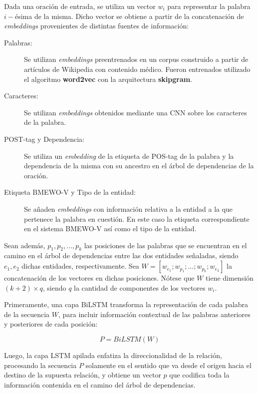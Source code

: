 Dada una oración de entrada, se utiliza un vector $w_i$ para representar la palabra $i-$ésima de la misma. Dicho vector se obtiene a partir de la concatenación de \textit{embeddings} provenientes de distintas fuentes de información:

\begin{description}
	\item[Palabras:] Se utilizan \textit{embeddings} preentrenados en un corpus construido a partir de artículos de Wikipedia con contenido médico.
	Fueron entrenados utilizado el algoritmo \textbf{word2vec}\cite{word2vec} con la arquitectura \textbf{skipgram}.
	
	\item[Caracteres:] Se utilizan \textit{embeddings} obtenidos mediante una CNN sobre los caracteres de la palabra.
	
	\item[POST-tag y Dependencia:] Se utiliza un \textit{embedding} de la etiqueta de POS-tag de la palabra y la dependencia de la misma con su ancestro en el árbol de dependencias de la oración.
	
	\item[Etiqueta BMEWO-V y Tipo de la entidad:] Se añaden \textit{embeddings} con información relativa a la entidad a la que pertenece la palabra en cuestión.
	En este caso la etiqueta correspondiente en el sistema BMEWO-V así como el tipo de la entidad.
	
\end{description}

Sean además, $p_1, p_2,\dots, p_k$ las posiciones de las palabras que se encuentran en el camino en el árbol de dependencias entre las dos entidades señaladas, siendo $e_1,e_2$ dichas entidades, respectivamente. Sea $W = [w_{e_1};w_{p_1};\dots;w_{p_k};w_{e_2}]$ la concatenación de los vectores en dichas posiciones. Nótese que $W$ tiene dimensión $(k+2) \times q$, siendo $q$ la cantidad de componentes de los vectores $w_i$.

Primeramente, una capa BiLSTM transforma la representación de cada palabra de la secuencia $W$, para incluir información contextual de las palabras anteriores y posteriores de cada posición:

\begin{equation*}
	P = BiLSTM(W)
\end{equation*}

Luego, la capa LSTM apilada enfatiza la direccionalidad de la relación, procesando la secuencia $P$ solamente en el sentido que va desde el origen hacia el destino de la supuesta relación, y obtiene un vector $p$ que codifica toda la información contenida en el camino del árbol de dependencias.

